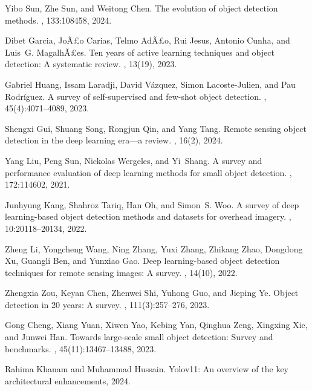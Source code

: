 \documentclass{article}
\begin{document}
\begin{thebibliography}{10}
Yibo Sun, Zhe Sun, and Weitong Chen.
\newblock The evolution of object detection methods.
, 133:108458, 2024.

Dibet Garcia, JoÃ£o Carias, Telmo AdÃ£o, Rui Jesus, Antonio Cunha, and Luis~G. MagalhÃ£es.
\newblock Ten years of active learning techniques and object detection: A systematic review.
, 13(19), 2023.

Gabriel Huang, Issam Laradji, David Vázquez, Simon Lacoste-Julien, and Pau Rodríguez.
\newblock A survey of self-supervised and few-shot object detection.
, 45(4):4071--4089, 2023.

Shengxi Gui, Shuang Song, Rongjun Qin, and Yang Tang.
\newblock Remote sensing object detection in the deep learning era—a review.
, 16(2), 2024.

Yang Liu, Peng Sun, Nickolas Wergeles, and Yi~Shang.
\newblock A survey and performance evaluation of deep learning methods for small object detection.
, 172:114602, 2021.

Junhyung Kang, Shahroz Tariq, Han Oh, and Simon~S. Woo.
\newblock A survey of deep learning-based object detection methods and datasets for overhead imagery.
, 10:20118--20134, 2022.

Zheng Li, Yongcheng Wang, Ning Zhang, Yuxi Zhang, Zhikang Zhao, Dongdong Xu, Guangli Ben, and Yunxiao Gao.
\newblock Deep learning-based object detection techniques for remote sensing images: A survey.
, 14(10), 2022.

Zhengxia Zou, Keyan Chen, Zhenwei Shi, Yuhong Guo, and Jieping Ye.
\newblock Object detection in 20 years: A survey.
, 111(3):257--276, 2023.

Gong Cheng, Xiang Yuan, Xiwen Yao, Kebing Yan, Qinghua Zeng, Xingxing Xie, and Junwei Han.
\newblock Towards large-scale small object detection: Survey and benchmarks.
, 45(11):13467--13488, 2023.

Rahima Khanam and Muhammad Hussain.
\newblock Yolov11: An overview of the key architectural enhancements, 2024.


\end{thebibliography}
\end{document}

